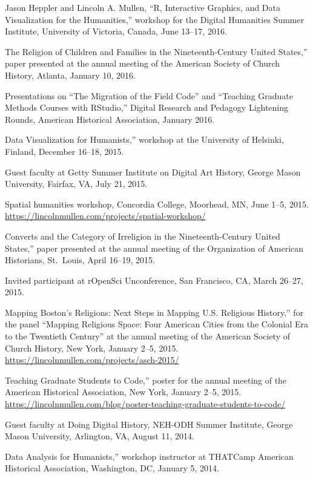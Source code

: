 \documentclass[11pt]{article}
\begin{document}
Jason Heppler and Lincoln A. Mullen, ``R, Interactive Graphics, and Data Visualization for the Humanities,'' workshop for the Digital Humanities Summer Institute, University of Victoria, Canada, June 13--17, 2016.  

\noindent{}The Religion of Children and Families in the Nineteenth-Century United States,'' paper presented at the annual meeting of the American Society of Church History, Atlanta, January 10, 2016.

Presentations on ``The Migration of the Field Code'' and ``Teaching Graduate Methods Courses with RStudio,'' Digital Research and Pedagogy Lightening Rounds, American Historical Association, January 2016.

\noindent{}Data Visualization for Humanists,'' workshop at the University of Helsinki, Finland, December 16--18, 2015. 

Guest faculty at Getty Summer Institute on Digital Art History, George Mason University, Fairfax, VA, July 21, 2015.

Spatial humanities workshop, Concordia College, Moorhead, MN, June 1--5, 2015. \url{https://lincolnmullen.com/projects/spatial-workshop/}

\noindent{}Converts and the Category of Irreligion in the Nineteenth-Century United States,'' paper presented at the annual meeting of the Organization of American Historians, St.~Louis, April 16--19, 2015.

Invited participant at rOpenSci Unconference, San Francisco, CA, March 26--27, 2015.

\noindent{}Mapping Boston's Religions: Next Steps in Mapping U.S. Religious History,'' for the panel ``Mapping Religious Space: Four American Cities from the Colonial Era to the Twentieth Century'' at the annual meeting of the American Society of Church History, New York, January 2--5, 2015.  
\url{https://lincolnmullen.com/projects/asch-2015/}

\noindent{}Teaching Graduate Students to Code,'' poster for the annual meeting of the American Historical Association, New York, January 2--5, 2015.  \url{https://lincolnmullen.com/blog/poster-teaching-graduate-students-to-code/}

Guest faculty at Doing Digital History, NEH-ODH Summer Institute, George Mason University, Arlington, VA, August 11, 2014.

\noindent{}Data Analysis for Humanists,'' workshop instructor at THATCamp American Historical Association, Washington, DC, January 5, 2014.
\end{document}
